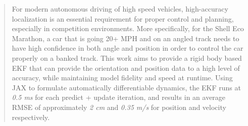 \begin{abstract}
  For modern autonomous driving of high speed vehicles, high-accuracy localization is an essential requirement for proper control and planning, especially in competition environments. More specifically, for the Shell Eco Marathon, a car that is going 20+ MPH and on an angled track needs to have high confidence in both angle and position in order to control the car properly on a banked track. This work aims to provide a rigid body based EKF that can provide the orientation and position data to a high level of accuracy, while maintaining model fidelity and speed at runtime. Using JAX to formulate automatically differentiable dynamics, the EKF runs at \textit{0.5 ms} for each predict + update iteration, and results in an average RMSE of approximately \textit{2 cm} and \textit{0.35 m/s} for position and velocity respectively.
\end{abstract}
